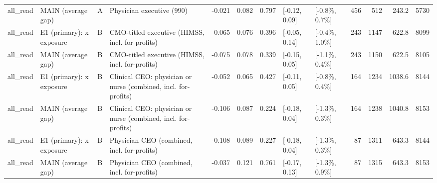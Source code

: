 \begin{tabular}{llllrrrllrrrr}
all\_read & MAIN (average gap) & A & Physician executive (990) & -0.021 & 0.082 & 0.797 & {}[-0.12, 0.09] & {}[-0.8\%, 0.7\%] & 456 & 512 & 243.2 & 5730\\
\addlinespace
all\_read & E1 (primary): x exposure & B & CMO-titled executive (HIMSS, incl. for-profits) & 0.065 & 0.076 & 0.396 & {}[-0.05, 0.14] & {}[-0.4\%, 1.0\%] & 243 & 1147 & 622.8 & 8099\\
all\_read & MAIN (average gap) & B & CMO-titled executive (HIMSS, incl. for-profits) & -0.075 & 0.078 & 0.339 & {}[-0.15, 0.05] & {}[-1.1\%, 0.4\%] & 243 & 1150 & 622.5 & 8105\\
all\_read & E1 (primary): x exposure & B & Clinical CEO: physician or nurse (combined, incl. for-profits) & -0.052 & 0.065 & 0.427 & {}[-0.11, 0.05] & {}[-0.8\%, 0.4\%] & 164 & 1234 & 1038.6 & 8144\\
all\_read & MAIN (average gap) & B & Clinical CEO: physician or nurse (combined, incl. for-profits) & -0.106 & 0.087 & 0.224 & {}[-0.18, 0.04] & {}[-1.3\%, 0.3\%] & 164 & 1238 & 1040.8 & 8153\\
all\_read & E1 (primary): x exposure & B & Physician CEO (combined, incl. for-profits) & -0.108 & 0.089 & 0.227 & {}[-0.18, 0.04] & {}[-1.3\%, 0.3\%] & 87 & 1311 & 643.3 & 8144\\
\addlinespace
all\_read & MAIN (average gap) & B & Physician CEO (combined, incl. for-profits) & -0.037 & 0.121 & 0.761 & {}[-0.17, 0.13] & {}[-1.3\%, 0.9\%] & 87 & 1315 & 643.3 & 8153\\
\bottomrule
\end{tabular}
